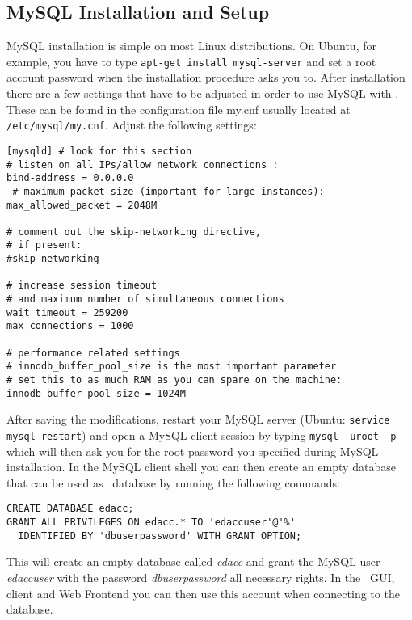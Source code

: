 \subsection{MySQL Installation and Setup}
MySQL installation is simple on most Linux distributions. On Ubuntu, for example, you
have to type \texttt{apt-get install mysql-server} and set a root account password
when the installation procedure asks you to.
 After installation there are a few settings
that have to be adjusted in order to use MySQL with \edacc. These can be found in the configuration file
my.cnf usually located at \texttt{/etc/mysql/my.cnf}. Adjust the following settings:
\begin{verbatim}
[mysqld] # look for this section
# listen on all IPs/allow network connections :
bind-address = 0.0.0.0
 # maximum packet size (important for large instances):
max_allowed_packet = 2048M

# comment out the skip-networking directive,
# if present:
#skip-networking

# increase session timeout
# and maximum number of simultaneous connections
wait_timeout = 259200
max_connections = 1000

# performance related settings
# innodb_buffer_pool_size is the most important parameter
# set this to as much RAM as you can spare on the machine:
innodb_buffer_pool_size = 1024M
\end{verbatim}
After saving the modifications, restart your MySQL server (Ubuntu: \texttt{service mysql restart})
and open a MySQL client session by typing \texttt{mysql -uroot -p} which will then ask you for
the root password you specified during MySQL installation.
In the MySQL client shell you can then create an empty database that can be used as \edacc~database
by running the following commands:
\begin{verbatim}
CREATE DATABASE edacc;
GRANT ALL PRIVILEGES ON edacc.* TO 'edaccuser'@'%'
  IDENTIFIED BY 'dbuserpassword' WITH GRANT OPTION;
\end{verbatim}
This will create an empty database called \textit{edacc} and grant the MySQL user \textit{edaccuser}
with the password \textit{dbuserpassword} all necessary rights. In the \edacc~GUI, client and Web Frontend
you can then use this account when connecting to the database.
